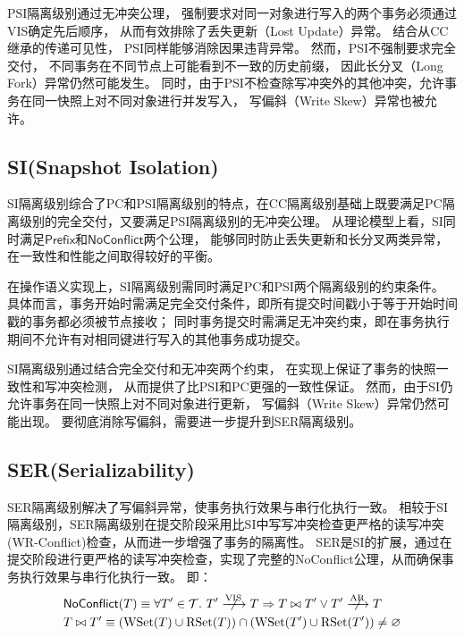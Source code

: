 PSI隔离级别通过无冲突公理，
强制要求对同一对象进行写入的两个事务必须通过VIS确定先后顺序，
从而有效排除了丢失更新（Lost Update）异常。
结合从CC继承的传递可见性，
PSI同样能够消除因果违背异常。
然而，PSI不强制要求完全交付，
不同事务在不同节点上可能看到不一致的历史前缀，
因此长分叉（Long Fork）异常仍然可能发生。
同时，由于PSI不检查除写冲突外的其他冲突，允许事务在同一快照上对不同对象进行并发写入，
写偏斜（Write Skew）异常也被允许。

\subsection{SI(Snapshot Isolation)}

SI隔离级别综合了PC和PSI隔离级别的特点，在CC隔离级别基础上既要满足PC隔离级别的完全交付，又要满足PSI隔离级别的无冲突公理。
从理论模型上看，SI同时满足$\mathsf{Prefix}$和$\mathsf{NoConflict}$两个公理，
能够同时防止丢失更新和长分叉两类异常，在一致性和性能之间取得较好的平衡。

在操作语义实现上，SI隔离级别需同时满足PC和PSI两个隔离级别的约束条件。
具体而言，事务开始时需满足完全交付条件，即所有提交时间戳小于等于开始时间戳的事务都必须被节点接收；
同时事务提交时需满足无冲突约束，即在事务执行期间不允许有对相同键进行写入的其他事务成功提交。

SI隔离级别通过结合完全交付和无冲突两个约束，
在实现上保证了事务的快照一致性和写冲突检测，
从而提供了比PSI和PC更强的一致性保证。
然而，由于SI仍允许事务在同一快照上对不同对象进行更新，
写偏斜（Write Skew）异常仍然可能出现。
要彻底消除写偏斜，需要进一步提升到SER隔离级别。

\subsection{SER(Serializability)}

SER隔离级别解决了写偏斜异常，使事务执行效果与串行化执行一致。
相较于SI隔离级别，SER隔离级别在提交阶段采用比SI中写写冲突检查更严格的读写冲突(WR-Conflict)检查，从而进一步增强了事务的隔离性。
SER是SI的扩展，通过在提交阶段进行更严格的读写冲突检查，实现了完整的NoConflict公理，从而确保事务执行效果与串行化执行一致。
即：
\begin{equation}
\begin{aligned}
&\mathsf{NoConflict}(T) \equiv \forall T' \in \mathcal{T}.
\ T' \centernot{\xrightarrow{\text{VIS}}} T \Rightarrow T \bowtie T' \lor T' \centernot{\xrightarrow{\text{AR}}} T \\ 
&T \bowtie T' \equiv (\text{WSet}(T) \cup \text{RSet}(T)) \cap (\text{WSet}(T') \cup \text{RSet}(T')) \neq \varnothing
\end{aligned}
\end{equation}

